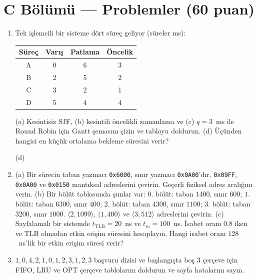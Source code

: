 \section*{C Bölümü --- Problemler \hfill (60 puan)}
\begin{enumerate}[leftmargin=2.0em,label=C\arabic*.,itemsep=0.5em]
  \item {} Tek işlemcili bir sisteme dört süreç geliyor (süreler ms):
  \begin{center}
  \begin{tabular}{@{}cccc@{}}
  \toprule
  \textbf{Süreç} & \textbf{Varış} & \textbf{Patlama} & \textbf{Öncelik} \\
  \midrule
  A & 0 & 6 & 3 \\ B & 2 & 5 & 2 \\ C & 3 & 2 & 1 \\ D & 5 & 4 & 4 \\
  \bottomrule
  \end{tabular}
  \end{center}
  (a) Kesintisiz SJF, (b) kesintili öncelikli zamanlama ve (c) $q = 3$~ms ile Round Robin için Gantt şemasını çizin ve tabloyu doldurun. (d) Üçünden hangisi en küçük ortalama bekleme süresini verir?

  \proctable
  \proctable
  \proctable
  \par\medskip (d) \hrulefill

  \newpage
  \item {}
  (a) Bir sürecin taban yazmacı \texttt{0x6000}, sınır yazmacı \texttt{0x0A00}'dır. \texttt{0x09FF}, \texttt{0x0A00} ve \texttt{0x0150} mantıksal adreslerini çevirin. Geçerli fiziksel adres aralığını verin. 
  \ans{2.6cm}
  (b) Bir bölüt tablosunda şunlar var: $0$. bölüt: taban $1400$, sınır $600$; $1$. bölüt: taban $6300$, sınır $400$; $2$. bölüt: taban $4300$, sınır $1100$; $3$. bölüt: taban $3200$, sınır $1000$. $\langle 2, 1099\rangle$, $\langle 1, 400\rangle$ ve $\langle 3, 512\rangle$ adreslerini çevirin. 
  \ans{2.4cm}
  (c) Sayfalamalı bir sistemde $t_{\text{TLB}} = 20$~ns ve $t_m = 100$~ns. İsabet oranı $0.8$ iken ve TLB olmadan etkin erişim süresini hesaplayın. Hangi isabet oranı $128$~ns'lik bir etkin erişim süresi verir? 
  \ans{2.6cm}

  \item {} $1, 0, 4, 2, 1, 0, 1, 2, 3, 1, 2, 3$ başvuru dizisi ve başlangıçta boş $3$ çerçeve için FIFO, LRU ve OPT çerçeve tablolarını doldurun ve sayfa hatalarını sayın.
  \par\medskip
  \par\medskip
  \par\medskip


\end{enumerate}
